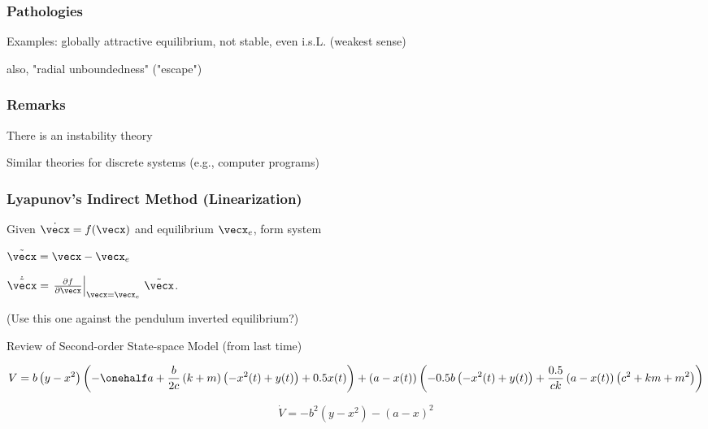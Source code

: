 \documentclass[12pt]{beamer}
\begin{document}
\begin{frame}
\frametitle{Pathologies}

Examples: globally attractive equilibrium, not stable, even i.s.L. (weakest sense)

also, "radial unboundedness" ("escape")

\end{frame}








\begin{frame}
\frametitle{Remarks}

There is an instability theory


Similar theories for discrete systems (e.g., computer programs)

\end{frame}




\begin{frame}
\frametitle{Lyapunov's Indirect Method (Linearization)}

Given $\dot \vecx = f(\vecx)$ and equilibrium $\vecx_e$,
form system

$\tilde\vecx = \vecx - \vecx_e$

$\dot{\tilde\vecx}
	= \left.
		\frac{\partial f }{\partial\vecx} \right|_{\vecx=\vecx_e}
		\, \tilde\vecx$.

(Use this one against the pendulum inverted equilibrium?)

\end{frame}




\begin{frame}{Review of Second-order State-space Model (from last time)}

\begin{equation}
V = b \left( y - x^{2}\right)
	\left(
		-\onehalf a + \frac{b}{2c} \left(k + m\right) \left(- x^{2}{\left (t \right )} + y{\left (t \right )}\right) + 0.5 x{\left (t \right )}\right)
		+ \left(a - x{\left (t \right )}\right) \left(- 0.5 b \left(- x^{2}{\left (t \right )} + y{\left (t \right )}\right) + \frac{0.5}{c k} \left(a - x{\left (t \right )}\right) \left(c^{2} + k m + m^{2}\right)\right)
\end{equation}

\begin{equation}
\dot V = -b^2 \left( y - x^2 \right) - \left( a - x \right)^2
\end{equation}

\end{frame}













\begin{frame}\end{frame}
\begin{frame}\end{frame}
\begin{frame}\end{frame}
\begin{frame}\end{frame}
\end{document}

